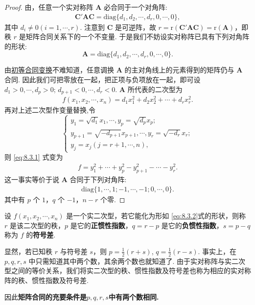 \documentclass[../../main.tex]{subfiles}%
\begin{document}
\begin{proof}

由，任意一个实对称阵 $\boldsymbol{A}$ 必合同于一个对角阵:
\begin{align*}
\boldsymbol{C}'\boldsymbol{A}\boldsymbol{C}=\mathrm{diag}\{d_1,d_2,\cdots,d_r,0,\cdots,0\},
\end{align*}
其中 $d_i\neq 0 (i = 1,\cdots,r)$. 注意到 $\boldsymbol{C}$ 是可逆阵，故 $r = \mathrm{r}(\boldsymbol{C}'\boldsymbol{A}\boldsymbol{C})=\mathrm{r}(\boldsymbol{A})$，即秩 $r$ 是矩阵合同关系下的一个不变量. 于是我们不妨设实对称阵已具有下列对角阵的形状:
\[
\boldsymbol{A}=\mathrm{diag}\{d_1,d_2,\cdots,d_r,0,\cdots,0\}.
\]

由\hyperref[lemma:初等合同变换]{初等合同变换}不难知道，任意调换 $\boldsymbol{A}$ 的主对角线上的元素得到的矩阵仍与 $\boldsymbol{A}$ 合同. 因此我们可把零放在一起，把正项与负项放在一起，即可设 $d_1>0,\cdots,d_p>0$; $d_{p + 1}<0,\cdots,d_r<0$. $\boldsymbol{A}$ 所代表的二次型为
\begin{align}
f(x_1,x_2,\cdots,x_n)=d_1x_1^2 + d_2x_2^2 + \cdots + d_rx_r^2.\label{eq:8.3.1}
\end{align}
再对上述二次型作变量替换,令
\[
\begin{cases}
y_1 = \sqrt{d_1}x_1,\cdots,y_p = \sqrt{d_p}x_p;\\
y_{p + 1} = \sqrt{-d_{p + 1}}x_{p + 1},\cdots,y_r = \sqrt{-d_r}x_r;\\
y_j = x_j (j = r + 1,\cdots,n),
\end{cases}
\]
则 \eqref{eq:8.3.1} 式变为
\begin{align*}
f = y_1^2 + \cdots + y_p^2 - y_{p + 1}^2 - \cdots - y_r^2.
\end{align*}
这一事实等价于说 $\boldsymbol{A}$ 合同于下列对角阵:
\begin{align*}
\mathrm{diag}\{1,\cdots,1;-1,\cdots,-1;0,\cdots,0\}.
\end{align*}
其中有 $p$ 个 $1$，$q$ 个 $-1$，$n - r$ 个零. 

\end{proof}

\begin{definition}
设 $f(x_1,x_2,\cdots,x_n)$ 是一个实二次型，若它能化为形如 \eqref{eq:8.3.2}式的形状，则称 $r$ 是该二次型的秩，$p$ 是它的\textbf{正惯性指数}，$q = r - p$ 是它的\textbf{负惯性指数}，$s = p - q$ 称为 $f$ 的\textbf{符号差}.
\end{definition}
\begin{remark}
显然，若已知秩 $r$ 与符号差 $s$，则 $p = \frac{1}{2}(r + s)$, $q = \frac{1}{2}(r - s)$. 事实上，在 $p,q,r,s$ 中只需知道其中两个数，其余两个数也就知道了. 由于实对称阵与实二次型之间的等价关系，我们将实二次型的秩、惯性指数及符号差也称为相应的实对称阵的秩、惯性指数及符号差.

因此\textbf{矩阵合同的充要条件是$p,q,r,s$中有两个数相同.}
\end{remark}
\end{document}
